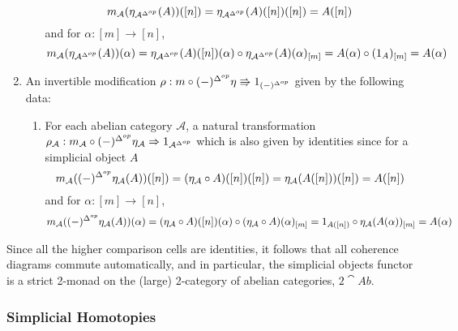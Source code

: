 \begin{enumerate}
\begin{enumerate}
        \begin{equation*}
            m_\mathcal{A}(\eta_{\mathcal{A}^{\Delta^{op}}}(A))([n]) = \eta_{\mathcal{A}^{\Delta^{op}}}(A)([n])([n]) = A([n])
        \end{equation*}
        and for $\alpha:[m]\rightarrow [n]$,
        \begin{equation*}
            m_\mathcal{A}(\eta_{\mathcal{A}^{\Delta^{op}}}(A))(\alpha) = \eta_{\mathcal{A}^{\Delta^{op}}}(A)([n])(\alpha)\circ \eta_{\mathcal{A}^{\Delta^{op}}}(A)(\alpha)_{[m]} = A(\alpha)\circ (1_A)_{[m]}=A(\alpha)
        \end{equation*}
    \end{enumerate}
    \item An invertible modification $\rho:m\circ(-)^{\Delta^{op}}\eta\Rrightarrow 1_{(-)^{\Delta^{op}}}$ given by the following data:
    \begin{enumerate}
        \item For each abelian category $\mathcal{A}$, a natural transformation $\rho_\mathcal{A}:m_\mathcal{A}\circ (-)^{\Delta^{op}}\eta_{\mathcal{A}}\Rightarrow 1_{\mathcal{A}^{\Delta^{op}}}$ which is also given by identities since for a simplicial object $A$
        \begin{equation*}
            m_\mathcal{A}((-)^{\Delta^{op}}\eta_{\mathcal{A}}(A))([n]) = (\eta_\mathcal{A}\circ A)([n])([n]) = \eta_\mathcal{A}(A([n]))([n]) = A([n])
        \end{equation*}
        and for $\alpha:[m]\rightarrow [n]$,
        \begin{equation*}
            m_\mathcal{A}((-)^{\Delta^{op}}\eta_{\mathcal{A}}(A))(\alpha) = (\eta_{\mathcal{A}}\circ A)([n])(\alpha)\circ (\eta_{\mathcal{A}}\circ A)(\alpha)_{[m]} = 1_{A([n])}\circ \eta_\mathcal{A}(A(\alpha))_{[m]} = A(\alpha)
        \end{equation*}
    \end{enumerate}
\end{enumerate}

Since all the higher comparison cells are identities, it follows that all coherence diagrams commute automatically, and in particular, the simplicial objects functor is a strict 2-monad on the (large) 2-category of abelian categories, $2\cat{Ab}$.

\subsubsection{Simplicial Homotopies}\label{subsec:simpHomotop}

